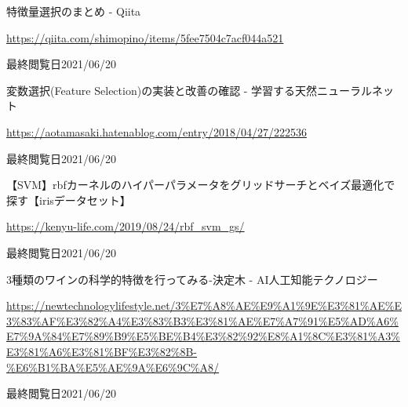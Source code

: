 \documentclass[12pt]{jarticle}
\begin{document}
\clearpage
\begin{thebibliography}{99}
    \label{sannkoubunnkenn_chapter}
    特徴量選択のまとめ - Qiita

    \url{https://qiita.com/shimopino/items/5fee7504c7acf044a521}

    最終閲覧日2021/06/20

    変数選択(Feature Selection)の実装と改善の確認 - 学習する天然ニューラルネット

    \url{https://aotamasaki.hatenablog.com/entry/2018/04/27/222536}

    最終閲覧日2021/06/20

    【SVM】rbfカーネルのハイパーパラメータをグリッドサーチとベイズ最適化で探す【irisデータセット】

    \url{https://kenyu-life.com/2019/08/24/rbf_svm_gs/}

    最終閲覧日2021/06/20

    3種類のワインの科学的特徴を行ってみる-決定木 - AI人工知能テクノロジー

    \url{https://newtechnologylifestyle.net/3%E7%A8%AE%E9%A1%9E%E3%81%AE%E3%83%AF%E3%82%A4%E3%83%B3%E3%81%AE%E7%A7%91%E5%AD%A6%E7%9A%84%E7%89%B9%E5%BE%B4%E3%82%92%E8%A1%8C%E3%81%A3%E3%81%A6%E3%81%BF%E3%82%8B-%E6%B1%BA%E5%AE%9A%E6%9C%A8/}

    最終閲覧日2021/06/20
\end{thebibliography}

\clearpage
\appendix
\end{document}
